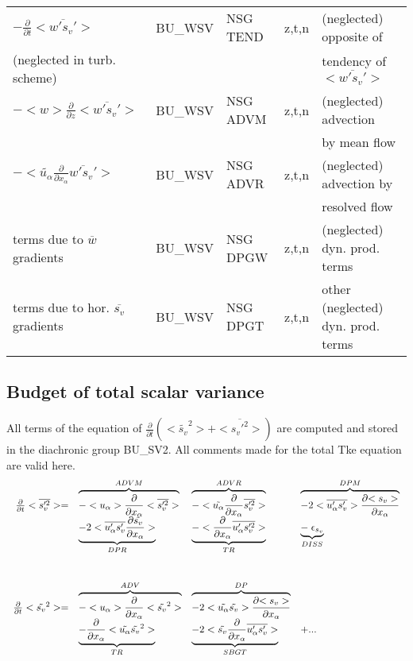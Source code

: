 \begin{center}
\begin{tabular}{||p{5cm}|>{\centering}p{2cm}|>{\centering}p{2.5cm}|>{\centering}p{0.5cm}|p{5.5cm }||}
\hline
\hline
$-\frac{\partial }{\partial t}<\overline{w's_v'}>$ & BU\_WSV & NSG TEND & z,t,n & (neglected) opposite of\\
(neglected in turb. scheme) & & & &tendency of $<\overline{w's_v'}>$ \\
\hline
$-<w>\frac{\partial}{\partial z}<\overline{w's_v'}>$  & BU\_WSV & NSG ADVM & z,t,n & (neglected) advection \\
 & & & & by mean flow\\
\hline
$-<\tilde{u_\alpha}\frac{\partial}{\partial x_\alpha}\overline{w's_v'}>$  & BU\_WSV & NSG ADVR & z,t,n & (neglected) advection by\\
 & & & &resolved flow\\
\hline
terms due to $\overline{w}$ gradients  & BU\_WSV & NSG DPGW & z,t,n & (neglected) dyn. prod. terms \\
\hline
terms due to hor. $\overline{s_v}$ gradients  & BU\_WSV & NSG DPGT & z,t,n & other (neglected) dyn. prod. terms\\
\hline
\hline
\end{tabular}
\end{center}


\newpage

\subsection{Budget of total scalar variance}


All terms of the equation of $\frac{\partial}{\partial t} (<\tilde{s_v}^2> + <\overline{s_v'^2}>)$ are
computed and stored in the diachronic group BU\_SV2. 
All comments made for the total Tke equation are valid here.\\

\begin{displaymath}
\left.
\begin{array}{rllll}
\frac{\partial }{\partial t} <\overline{s_v'^2}> = & 
\overbrace{- <u_\alpha>\frac{\partial}{\partial x_\alpha} <\overline{s_v'^2}> }^{ADVM}  &
\overbrace{- <\tilde{u_\alpha}\frac{\partial}{\partial x_\alpha} \overline{s_v'^2} > }^{ADVR} &
\overbrace{- 2 <\overline{u_\alpha's_v'}> \frac{\partial {<s_v>}}{\partial x_\alpha} }^{DPM} \\
\vspace*{1.0cm}
& \underbrace{- 2 <\overline{u'_\alpha s_v'} \frac{\partial {\tilde{s_v}}}{\partial x_\alpha}>}_{DPR}  &
 \underbrace{- <\frac{\partial}{\partial x_\alpha} \overline{u'_\alpha s_v'^2}>}_{TR}
 & \underbrace{-\; \epsilon_{s_v}}_{DISS}\\
\frac{\partial }{\partial t} <\tilde{s_v}^2> = & 
\overbrace{- <u_\alpha>\frac{\partial}{\partial x_\alpha} <\tilde{s_v}^2> }^{ADV} &
\overbrace{- 2<\tilde{u_\alpha} \tilde{s_v}> \frac{\partial {<s_v>}}{\partial x_\alpha}}^{DP} &\\
& \underbrace{- \frac{\partial}{\partial x_\alpha} <\tilde{u_\alpha} \tilde{s_v}^2>}_{TR} &
\underbrace{- 2 <\tilde{s_v}\frac{\partial}{\partial x_\alpha}\overline{u'_\alpha s_v'}>}_{SBGT} & + ...
\end{array}
\right.
\end{displaymath}


